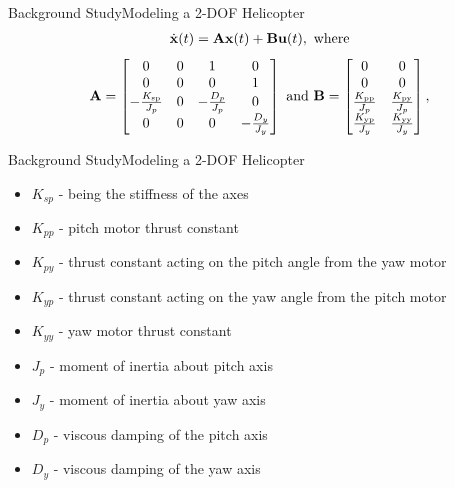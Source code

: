 \documentclass{beamer}
\begin{document}
\begin{frame}{Background Study}{Modeling a 2-DOF Helicopter}
\begin{align}
  \dot{\bf x}(t) = {\bf A}{\bf x}(t) +{\bf B}{\bf u}(t),~\mathrm{where}
\label{eq:stateModel}
\end{align}  
%
\begin{align*}
{\bf A} =  
\begin{bmatrix}
0 & 0 & 1 & 0\\
0 & 0 & 0 & 1\\
-\frac{K_{\text{sp}}}{J_p} & 0 & -\frac{D_p}{J_p} &  0\\
0 & 0 & 0 & -\frac{D_y}{J_y}    
\end{bmatrix}
~\text{and}~
  {\bf B} =
\begin{bmatrix}
0 & 0\\
0 & 0\\
\frac{K_{\text{pp}}}{J_p} & \frac{K_{\text{py}}}{J_p}\\
\frac{K_{\text{yp}}}{J_y} & \frac{K_{\text{yy}}}{J_y}                           
\end{bmatrix},
\end{align*}
\end{frame}

\begin{frame}{Background Study}{Modeling a 2-DOF Helicopter}
\begin{itemize}
    \item $K_{sp}$ - being the stiffness of the axes
    \item $K_{pp}$ - pitch motor thrust constant
    \item $K_{py}$ - thrust constant acting on the pitch angle from the yaw motor
    \item $K_{yp}$ - thrust constant acting on the yaw angle from the pitch motor
    \item $K_{yy}$ - yaw motor thrust constant
    \item $J_p$ - moment of inertia about pitch axis
    \item $J_y$ - moment of inertia about yaw axis
    \item $D_p$ - viscous damping of the pitch axis
    \item $D_y$ - viscous damping of the yaw axis
\end{itemize}
\end{frame}


\end{document}
